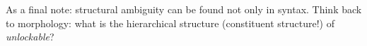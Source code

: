 \documentclass{article}
\begin{document}
As a final note: structural ambiguity can be found not only in syntax. Think back to morphology: what is the hierarchical structure (constituent structure!) of \emph{unlockable}?





\end{document}
